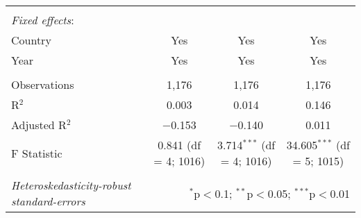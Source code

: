 \documentclass[a4paper, 12pt]{article}
\begin{document}
\begin{table}[!htbp]
{\begin{tabular}{@{\extracolsep{5pt}}lccc}
  & & & \\ 
      \hline \\[-1.8ex] 
 \textit{Fixed effects}:\\
Country & Yes & Yes & Yes\\
Year & Yes & Yes & Yes \\
\hline \\[-1.8ex] 
Observations & 1,176 & 1,176 & 1,176 \\ 
R$^{2}$ & 0.003 & 0.014 & 0.146 \\ 
Adjusted R$^{2}$ & $-$0.153 & $-$0.140 & 0.011 \\ 
F Statistic & 0.841 (df = 4; 1016) & 3.714$^{***}$ (df = 4; 1016) & 34.605$^{***}$ (df = 5; 1015) \\ 
\hline 
\hline \\[-1.8ex] 
\footnotesize{\textit{Heteroskedasticity-robust standard-errors}}  & \multicolumn{3}{r}{$^{*}$p$<$0.1; $^{**}$p$<$0.05; $^{***}$p$<$0.01} \\ 
\end{tabular} 
}
\end{table} 
    
       \begin{table}[!htbp]
        \centering
        \caption{Causal mediation analysis}
        \label{mediateres}
    \end{table}
    
\end{document}
